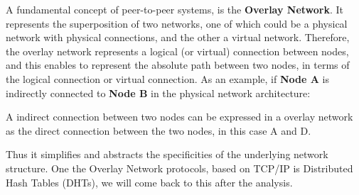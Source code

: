 \documentclass[11pt]{amsart}
\begin{document}
        A fundamental concept of peer-to-peer systems, is the
        \textbf{Overlay Network}. It represents the superposition of
        two networks, one of which could be a physical network with
        physical connections, and the other a virtual
        network. Therefore, the overlay network represents a logical
        (or virtual) connection between nodes, and this enables to
        represent the absolute path between two nodes, in terms of the
        logical connection or virtual connection. As an example, if
        \textbf{Node A} is indirectly connected to \textbf{Node B} in
        the physical network architecture:

        \begin{center}
        \end{center}


        A indirect connection between two nodes can be expressed in a overlay network as
        the direct connection between the two nodes, in this case A and D.

        Thus it simplifies and abstracts the specificities of the underlying network
        structure. One the Overlay Network protocols, based on TCP/IP is Distributed Hash
        Tables (DHTs), we will come back to this after the analysis.
\end{document}
